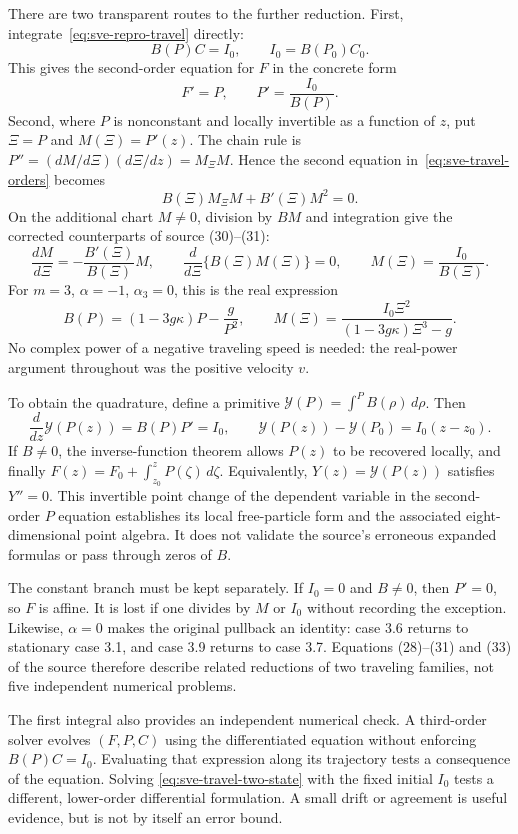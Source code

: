 There are two transparent routes to the further reduction. First,
integrate~\eqref{eq:sve-repro-travel} directly:
\[
 B(P)C=I_0,\qquad I_0=B(P_0)C_0.
\]
This gives the second-order equation for $F$ in the concrete form
\begin{equation}
 F'=P,\qquad P'=\frac{I_0}{B(P)}.
 \label{eq:sve-travel-two-state}
\end{equation}
Second, where $P$ is nonconstant and locally invertible as a function of
$z$, put $\Xi=P$ and $M(\Xi)=P'(z)$. The chain rule is
$P''=(dM/d\Xi)(d\Xi/dz)=M_\Xi M$. Hence the second equation
in~\eqref{eq:sve-travel-orders} becomes
\[
 B(\Xi)M_\Xi M+B'(\Xi)M^2=0.
\]
On the additional chart $M\ne0$, division by $BM$ and integration give
the corrected counterparts of source (30)--(31):
\begin{equation}
 \frac{dM}{d\Xi}=-\frac{B'(\Xi)}{B(\Xi)}M,
 \qquad \frac{d}{d\Xi}\{B(\Xi)M(\Xi)\}=0,
 \qquad M(\Xi)=\frac{I_0}{B(\Xi)}.
 \label{eq:sve-travel-further}
\end{equation}
For $m=3$, $\alpha=-1$, $\alpha_3=0$, this is the real expression
\[
 B(P)=(1-3g\kappa)P-\frac g{P^2},\qquad
 M(\Xi)=\frac{I_0\Xi^2}{(1-3g\kappa)\Xi^3-g}.
\]
No complex power of a negative traveling speed is needed: the real-power
argument throughout was the positive velocity $v$.

To obtain the quadrature, define a primitive
$\mathcal Y(P)=\int^P B(\rho)\,d\rho$. Then
\[
 \frac{d}{dz}\mathcal Y(P(z))=B(P)P'=I_0,\qquad
 \mathcal Y(P(z))-\mathcal Y(P_0)=I_0(z-z_0).
\]
If $B\ne0$, the inverse-function theorem allows $P(z)$ to be recovered
locally, and finally $F(z)=F_0+\int_{z_0}^zP(\zeta)\,d\zeta$.
Equivalently, $Y(z)=\mathcal Y(P(z))$ satisfies $Y''=0$.
This invertible point change of the dependent variable in the
second-order $P$ equation establishes its local free-particle form and
the associated eight-dimensional point algebra. It does not validate the
source's erroneous expanded formulas or pass through zeros of $B$.

The constant branch must be kept separately. If $I_0=0$ and $B\ne0$,
then $P'=0$, so $F$ is affine. It is lost if one divides by $M$ or $I_0$
without recording the exception. Likewise, $\alpha=0$ makes the
original pullback an identity: case 3.6 returns to stationary case 3.1,
and case 3.9 returns to case 3.7. Equations (28)--(31) and (33) of the
source therefore describe related reductions of two traveling families,
not five independent numerical problems.

The first integral also provides an independent numerical check.
A third-order solver evolves $(F,P,C)$ using the differentiated equation
without enforcing $B(P)C=I_0$. Evaluating that expression along its
trajectory tests a consequence of the equation. Solving
\eqref{eq:sve-travel-two-state} with the fixed initial $I_0$ tests a
different, lower-order differential formulation. A small drift or
agreement is useful evidence, but is not by itself an error bound.

